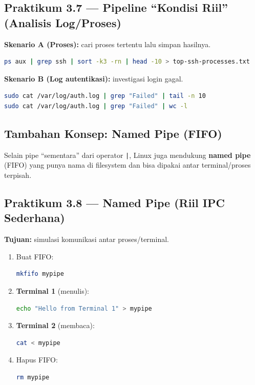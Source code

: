\subsection*{Praktikum 3.7 --- Pipeline ``Kondisi Riil'' (Analisis Log/Proses)}
\textbf{Skenario A (Proses):} cari proses tertentu lalu simpan hasilnya.
\begin{lstlisting}[language=bash, caption={Filter proses dan simpan}]
ps aux | grep ssh | sort -k3 -rn | head -10 > top-ssh-processes.txt
\end{lstlisting}

\textbf{Skenario B (Log autentikasi):} investigasi login gagal.
\begin{lstlisting}[language=bash, caption={Analisis login gagal}]
sudo cat /var/log/auth.log | grep "Failed" | tail -n 10
sudo cat /var/log/auth.log | grep "Failed" | wc -l
\end{lstlisting}

\subsection*{Tambahan Konsep: Named Pipe (FIFO)}
Selain pipe ``sementara'' dari operator \texttt{|}, Linux juga mendukung \textbf{named pipe} (FIFO) yang punya nama di filesystem
dan bisa dipakai antar terminal/proses terpisah.

\subsection*{Praktikum 3.8 --- Named Pipe (Riil IPC Sederhana)}
\textbf{Tujuan:} simulasi komunikasi antar proses/terminal.

\begin{enumerate}
    \item Buat FIFO:
\begin{lstlisting}[language=bash, caption={Membuat FIFO}]
mkfifo mypipe
\end{lstlisting}

    \item \textbf{Terminal 1} (menulis):
\begin{lstlisting}[language=bash, caption={Menulis ke FIFO}]
echo "Hello from Terminal 1" > mypipe
\end{lstlisting}

    \item \textbf{Terminal 2} (membaca):
\begin{lstlisting}[language=bash, caption={Membaca dari FIFO}]
cat < mypipe
\end{lstlisting}

    \item Hapus FIFO:
\begin{lstlisting}[language=bash, caption={Menghapus FIFO}]
rm mypipe
\end{lstlisting}
\end{enumerate}

